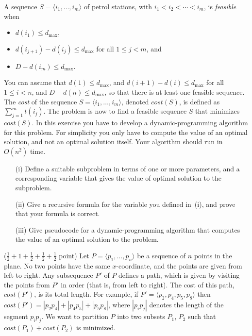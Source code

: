 \documentclass{article}
\newcommand{\cost}{\mathit{cost}}
\renewcommand{\leq}{\leqslant}
\newcommand{\BeginMyItemize}{\begin{itemize}\setlength{\itemsep}{-\parskip}}
\newcommand{\EndMyItemize}{\end{itemize}}
\newcommand{\myitemize}[1]{\BeginMyItemize #1 \EndMyItemize}
\newcounter{rcounter}
\newenvironment{rlist}%
{\begin{list}{A.2-\arabic{rcounter}}{\usecounter{rcounter}}}{\end{list}}
\begin{document}
\begin{rlist}
      A sequence $S=\langle i_1,\ldots,i_m\rangle$ of petrol stations, with $i_1<i_2<\cdots <i_m$,
      is \emph{feasible} when
      \myitemize{
      \item $d(i_1) \leq d_{\max}$,
      \item $d(i_{j+1})-d(i_j) \leq d_{\max}$ for all $1\leq j<m$, and
      \item $D-d(i_m)\leq d_{\max}$.
      }
      You can assume that $d(1) \leq d_{\max}$, and $d(i+1)-d(i) \leq d_{\max}$
      for all $1\leq i<n$, and $D-d(n)\leq d_{\max}$, so that
      there is at least one feasible sequence.  The \emph{cost}
      of the sequence $S=\langle i_1,\ldots,i_m\rangle$, denoted $\cost(S)$, is
      defined as $\sum_{j=1}^{m} t(i_j)$.
      The problem is now to find a feasible sequence $S$ that minimizes $\cost(S)$.
      In this exercise you have to develop a dynamic-programming algorithm for this
      problem. For simplicity you only have to compute the value of an optimal
      solution, and not an optimal solution itself.
      Your algorithm should run in $O(n^2)$ time.
      \begin{enumerate}
      \item[(i)] Define a suitable subproblem in terms of one or more parameters,
                 and a corresponding variable that gives the value of optimal solution to the subproblem.
      \item[(ii)] Give a recursive formula for the variable you defined in~(i),
                  and prove that your formula is correct.
      \item[(iii)] Give pseudocode for a dynamic-programming algorithm that computes
                   the value of an optimal solution to the
                   problem.
      \end{enumerate}
\item ($\frac{1}{2}+1+\frac{1}{2}+\frac{1}{2}+\frac{1}{2}$ point)
      Let $P=\langle p_1,\ldots,p_n \rangle$ be a sequence of $n$ points in the plane.
      No two points have the same $x$-coordinate, and the points are given from left to right.
      Any subsequence $P'$ of $P$ defines a path, which is given by visiting the points
      from $P'$ in order (that is, from left to right). The cost of this path, $\cost(P')$,
      is its total length. For example, if $P' = \langle p_2, p_4, p_5, p_8\rangle$ then
      $\cost(P') = |p_2p_4| + |p_4p_5| + |p_5p_8|$, where $|p_ip_j|$ denotes the
      length of the segment $p_ip_j$. We want to partition $P$ into two subsets $P_1$, $P_2$
      such that $\cost(P_1)+\cost(P_2)$ is minimized.

\end{rlist}
\end{document}
